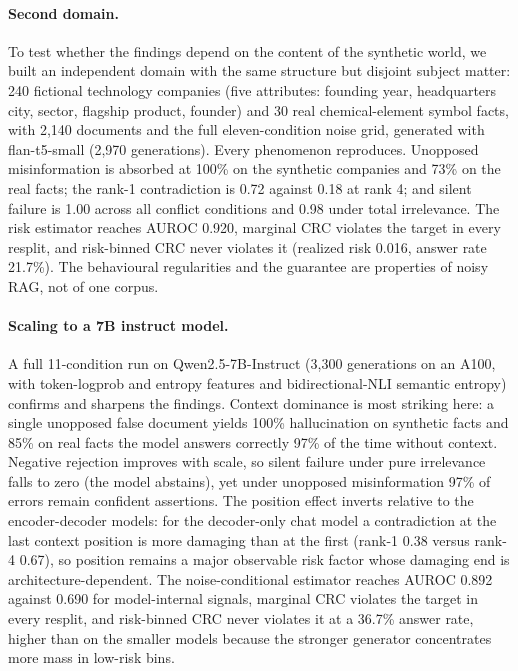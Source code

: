 \documentclass[11pt]{article}
\begin{document}
\paragraph{Second domain.}
To test whether the findings depend on the content of the synthetic
world, we built an independent domain with the same structure but
disjoint subject matter: 240 fictional technology companies (five
attributes: founding year, headquarters city, sector, flagship product,
founder) and 30 real chemical-element symbol facts, with 2{,}140
documents and the full eleven-condition noise grid, generated with
flan-t5-small (2{,}970 generations). Every phenomenon reproduces.
Unopposed misinformation is absorbed at 100\% on the synthetic
companies and 73\% on the real facts; the rank-1 contradiction is
0.72 against 0.18 at rank 4; and silent failure is 1.00 across all
conflict conditions and 0.98 under total irrelevance. The risk
estimator reaches AUROC 0.920, marginal CRC violates the target in
every resplit, and risk-binned CRC never violates it (realized risk
0.016, answer rate 21.7\%). The behavioural regularities and the
guarantee are properties of noisy RAG, not of one corpus.

\paragraph{Scaling to a 7B instruct model.}
A full 11-condition run on Qwen2.5-7B-Instruct (3{,}300 generations on
an A100, with token-logprob and entropy features and bidirectional-NLI
semantic entropy) confirms and sharpens the findings. Context dominance
is most striking here: a single unopposed false document yields 100\%
hallucination on synthetic facts and 85\% on real facts the model
answers correctly 97\% of the time without context. Negative rejection
improves with scale, so silent failure under pure irrelevance falls to
zero (the model abstains), yet under unopposed misinformation 97\% of
errors remain confident assertions. The position effect inverts relative
to the encoder-decoder models: for the decoder-only chat model a
contradiction at the last context position is more damaging than at the
first (rank-1 0.38 versus rank-4 0.67), so position remains a major
observable risk factor whose damaging end is architecture-dependent. The
noise-conditional estimator reaches AUROC 0.892 against 0.690 for
model-internal signals, marginal CRC violates the target in every
resplit, and risk-binned CRC never violates it at a 36.7\% answer rate,
higher than on the smaller models because the stronger generator
concentrates more mass in low-risk bins.
\end{document}
